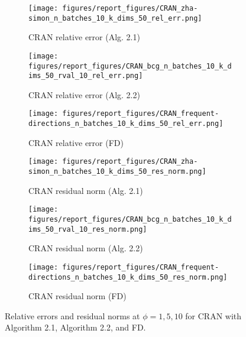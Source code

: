 \begin{figure}[h]
  \centering
  \begin{subfigure}[b]{0.33\textwidth}
    \centering
    \texttt{[image: figures/report\_figures/CRAN\_zha-simon\_n\_batches\_10\_k\_dims\_50\_rel\_err.png]}
    \caption{CRAN relative error (Alg. 2.1)}
  \end{subfigure}
  \hfill
  \begin{subfigure}[b]{0.33\textwidth}
    \centering
    \texttt{[image: figures/report\_figures/CRAN\_bcg\_n\_batches\_10\_k\_dims\_50\_rval\_10\_rel\_err.png]}
    \caption{CRAN relative error (Alg. 2.2)}
  \end{subfigure}
  \hfill
  \begin{subfigure}[b]{0.33\textwidth}
    \centering
    \texttt{[image: figures/report\_figures/CRAN\_frequent-directions\_n\_batches\_10\_k\_dims\_50\_rel\_err.png]}
    \caption{CRAN relative error (FD)}
    \label{fig:cran_rel_err_fd}
  \end{subfigure}
  \begin{subfigure}[b]{0.33\textwidth}
    \centering
    \texttt{[image: figures/report\_figures/CRAN\_zha-simon\_n\_batches\_10\_k\_dims\_50\_res\_norm.png]}
    \caption{CRAN residual norm (Alg. 2.1)}
  \end{subfigure}
  \hfill
  \begin{subfigure}[b]{0.33\textwidth}
    \centering
    \texttt{[image: figures/report\_figures/CRAN\_bcg\_n\_batches\_10\_k\_dims\_50\_rval\_10\_res\_norm.png]}
    \caption{CRAN residual norm (Alg. 2.2)}
  \end{subfigure}
  \hfill
  \begin{subfigure}[b]{0.33\textwidth}
    \centering
    \texttt{[image: figures/report\_figures/CRAN\_frequent-directions\_n\_batches\_10\_k\_dims\_50\_res\_norm.png]}
    \caption{CRAN residual norm (FD)}
    \label{fig:cran_res_norm_fd}
  \end{subfigure}
  \caption{Relative errors and residual norms at $\phi=1,5,10$ for CRAN with Algorithm 2.1, Algorithm 2.2, and FD.}
  \label{fig:cran_relerr_resnorm}
\end{figure}